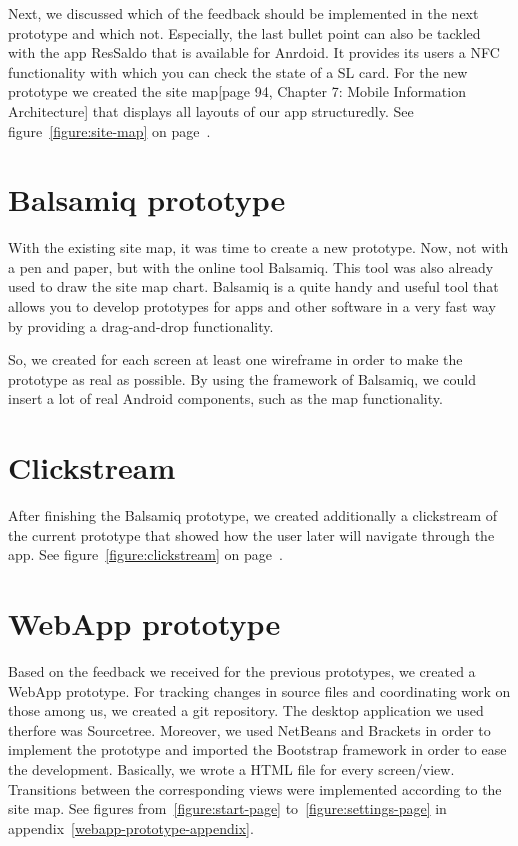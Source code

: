 \documentclass[11pt,twoside,a4paper]{report}
\begin{document}
Next, we discussed which of the feedback should be implemented in the next prototype and which not. Especially, the last bullet point can also be tackled with the app ResSaldo\cite{ressaldo} that is available for Anrdoid. It provides its users a NFC functionality with which you can check the state of a SL card. For the new prototype we created the site map[page 94, Chapter 7: Mobile Information Architecture] that displays all layouts of our app structuredly. See figure~\ref{figure:site-map} on page~\pageref{figure:site-map}.

\section{Balsamiq prototype}

With the existing site map, it was time to create a new prototype. Now, not with a pen and paper, but with the online tool Balsamiq. This tool was also already used to draw the site map chart. Balsamiq is a quite handy and useful tool that allows you to develop prototypes for apps and other software in a very fast way by providing a drag-and-drop functionality.

So, we created for each screen at least one wireframe in order to make the prototype as real as possible. By using the framework of Balsamiq, we could insert a lot of real Android components, such as the map functionality.

\section{Clickstream}

After finishing the Balsamiq prototype, we created additionally a clickstream of the current prototype that showed how the user later will navigate through the app. See figure~\ref{figure:clickstream} on page~\pageref{figure:clickstream}.

\section{WebApp prototype}

Based on the feedback we received for the previous prototypes, we created a WebApp prototype. For tracking changes in source files and coordinating work on those among us, we created a git repository. The desktop application we used therfore was Sourcetree. Moreover, we used NetBeans and Brackets in order to implement the prototype and imported the Bootstrap framework in order to ease the development. Basically, we wrote a HTML file for every screen/view. Transitions between the corresponding views were implemented according to the site map. See figures from~\ref{figure:start-page} to~\ref{figure:settings-page} in appendix~\ref{webapp-prototype-appendix}.
\end{document}
